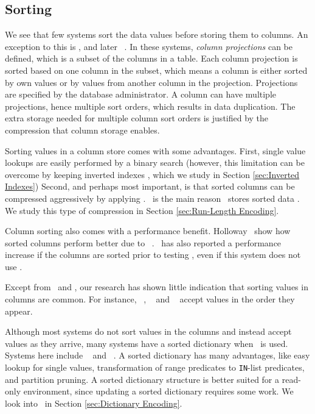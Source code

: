 \subsection{Sorting}
\label{sub:Sorting}
We see that few systems sort the data values before storing them to columns. An exception to this is \cstore, and later \vertica~\cite{Lamb2012-kg, Stonebraker2005-qz}. In these systems, \textit{column projections} can be defined, which is a subset of the columns in a table. Each column projection is sorted based on one column in the subset, which means a column is either sorted by own values or by values from another column in the projection. Projections are specified by the database administrator. A column can have multiple projections, hence multiple sort orders, which results in data duplication. The extra storage needed for multiple column sort orders is justified by the compression that column storage enables.


Sorting values in a column store comes with some advantages. First, single value lookups are easily performed by a binary search (however, this limitation can be overcome by keeping inverted indexes \cite{Lemke2010-is, Schwalb2014-hn}, which we study in Section \ref{sec:Inverted Indexes}) Second, and perhaps most important, is that sorted columns can be compressed aggressively by applying \rle. \rle~is the main reason \cstore~stores sorted data \cite{Stonebraker2005-qz}. We study this type of compression in Section \ref{sec:Run-Length Encoding}.

Column sorting also comes with a performance benefit. Holloway \ea~show how sorted columns perform better due to \rle~\cite{Holloway2008-rr}. \blink~has also reported a performance increase if the columns are sorted prior to testing \cite{Johnson2008-cp}, even if this system does not use \rle.

Except from \cstore~and \vertica, our research has shown little indication that sorting values in columns are common. For instance, \mssql~\cite{Larson2013-mc}, \blink~\cite{Raman2013-em} and \oracle~\cite{Lahiri2015-mz} accept values in the order they appear.

Although most systems do not sort values in the columns and instead accept values as they arrive, many systems have a sorted dictionary when \de~is used. Systems here include \blink~\cite{Johnson2008-cp} and \saph~\cite{Farber2012-vh}. A sorted dictionary has many advantages, like easy lookup for single values, transformation of range predicates to \texttt{IN}-list predicates, and partition pruning. A sorted dictionary structure is better suited for a read-only environment, since updating a sorted dictionary requires some work. We look into \de~in Section \ref{sec:Dictionary Encoding}.

